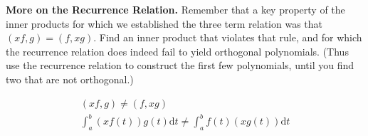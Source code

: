 \textbf{More on the Recurrence Relation.} Remember that a key property
of the inner products for which we established the three term relation
was that $(xf,g) = (f,xg)$. Find an inner product that violates that
rule, and for which the recurrence relation does indeed fail to yield
orthogonal polynomials. (Thus use the recurrence relation to construct
the first few polynomials, until you find two that are not orthogonal.)

{\color{blue}
\[
\begin{aligned}
(xf, g) \ne (f, xg) \\
\int_a^b (x f(t)) g(t) \textrm{d}t \ne \int_a^b f(t) (x g(t)) \textrm{d}t
\end{aligned}
\]



}
